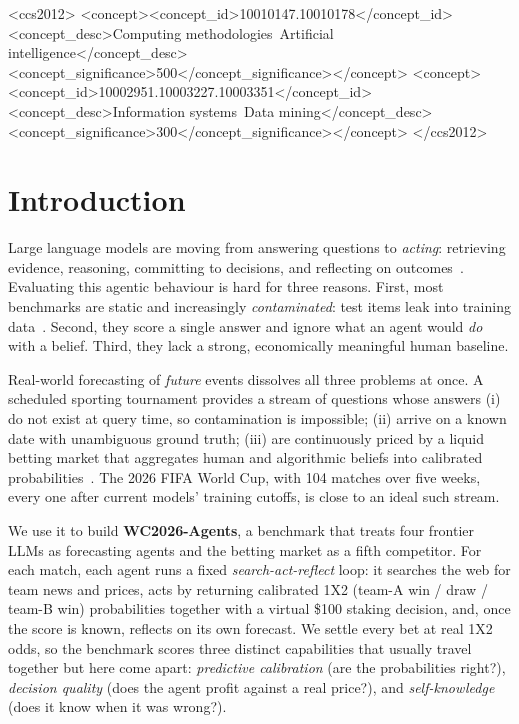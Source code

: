 \documentclass[sigconf,review]{acmart}
\begin{document}
\begin{CCSXML}
<ccs2012>
<concept><concept_id>10010147.10010178</concept_id>
<concept_desc>Computing methodologies~Artificial intelligence</concept_desc>
<concept_significance>500</concept_significance></concept>
<concept><concept_id>10002951.10003227.10003351</concept_id>
<concept_desc>Information systems~Data mining</concept_desc>
<concept_significance>300</concept_significance></concept>
</ccs2012>
\end{CCSXML}


\maketitle

\section{Introduction}
Large language models are moving from answering questions to \emph{acting}:
retrieving evidence, reasoning, committing to decisions, and reflecting on
outcomes~\cite{yao2023react,park2023generative,xi2023agents}. Evaluating this
agentic behaviour is hard for three reasons. First, most benchmarks are static
and increasingly \emph{contaminated}: test items leak into training
data~\cite{golchin2024contamination,liang2023helm}. Second, they score a single
answer and ignore what an agent would \emph{do} with a belief. Third, they lack
a strong, economically meaningful human baseline.

Real-world forecasting of \emph{future} events dissolves all three problems at
once. A scheduled sporting tournament provides a stream of questions whose
answers (i) do not exist at query time, so contamination is impossible; (ii)
arrive on a known date with unambiguous ground truth; (iii) are continuously
priced by a liquid betting market that aggregates human and algorithmic beliefs
into calibrated probabilities~\cite{strumbelj2014odds,wolfers2004prediction}.
The 2026 FIFA World Cup, with 104 matches over five weeks, every one after current
models' training cutoffs, is close to an ideal such stream.

We use it to build \textbf{WC2026-Agents}, a benchmark that treats four frontier
LLMs as forecasting agents and the betting market as a fifth competitor. For
each match, each agent runs a fixed \emph{search-act-reflect} loop: it
searches the web for team news and prices, acts by returning calibrated
1X2 (team-A win / draw / team-B win) probabilities together with a virtual
\$100 staking decision, and, once the score is known, reflects on its own
forecast. We settle every
bet at real 1X2 odds, so the benchmark scores three distinct capabilities that
usually travel together but here come apart: \emph{predictive calibration}
(are the probabilities right?), \emph{decision quality} (does the agent profit
against a real price?), and \emph{self-knowledge} (does it know when it was
wrong?).
\end{document}
